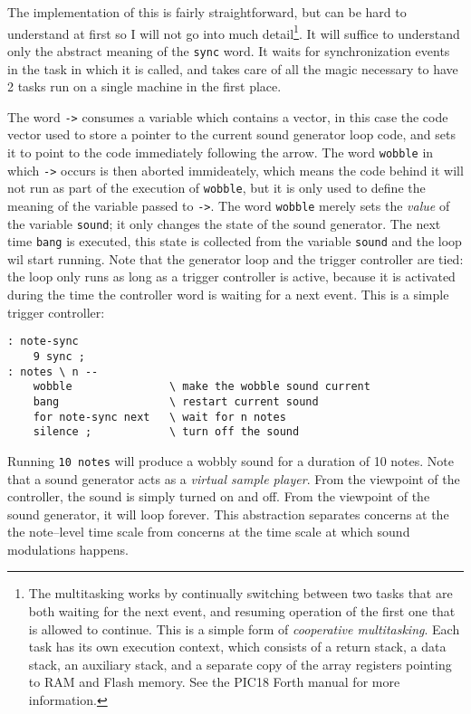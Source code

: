 \documentclass[12pt]{article}
\begin{document}
The implementation of this is fairly straightforward, but can be hard
to understand at first so I will not go into much detail\footnote{The
  multitasking works by continually switching between two tasks that
  are both waiting for the next event, and resuming operation of the
  first one that is allowed to continue. This is a simple form of
  \emph{cooperative multitasking}.  Each task has its own execution
  context, which consists of a return stack, a data stack, an
  auxiliary stack, and a separate copy of the array registers pointing
  to RAM and Flash memory. See the PIC18 Forth manual for more
  information.}. It will suffice to understand only the abstract
meaning of the \verb|sync| word. It waits for synchronization events
in the task in which it is called, and takes care of all the magic
necessary to have 2 tasks run on a single machine in the first place.

The word \verb|->| consumes a variable which contains a vector, in
this case the code vector used to store a pointer to the current sound
generator loop code, and sets it to point to the code immediately
following the arrow. The word \verb|wobble| in which \verb|->| occurs
is then aborted immideately, which means the code behind it will not
run as part of the execution of \verb|wobble|, but it is only used to
define the meaning of the variable passed to \verb|->|.  The word
\verb|wobble| merely sets the \emph{value} of the variable
\verb|sound|; it only changes the state of the sound generator. The
next time \verb|bang| is executed, this state is collected from the
variable \verb|sound| and the loop wil start running. Note that the
generator loop and the trigger controller are tied: the loop only runs
as long as a trigger controller is active, because it is activated
during the time the controller word is waiting for a next event.  This
is a simple trigger controller:
\begin{samepage}
\begin{verbatim}
: note-sync
    9 sync ;
: notes \ n -- 
    wobble               \ make the wobble sound current
    bang                 \ restart current sound
    for note-sync next   \ wait for n notes
    silence ;            \ turn off the sound
\end{verbatim}
\end{samepage}
Running \verb|10 notes| will produce a wobbly sound for a duration of
10 notes. Note that a sound generator acts as a \emph{virtual sample
  player}. From the viewpoint of the controller, the sound is simply
turned on and off. From the viewpoint of the sound generator, it will
loop forever. This abstraction separates concerns at the the
note--level time scale from concerns at the time scale at which sound
modulations happens.
\end{document}

